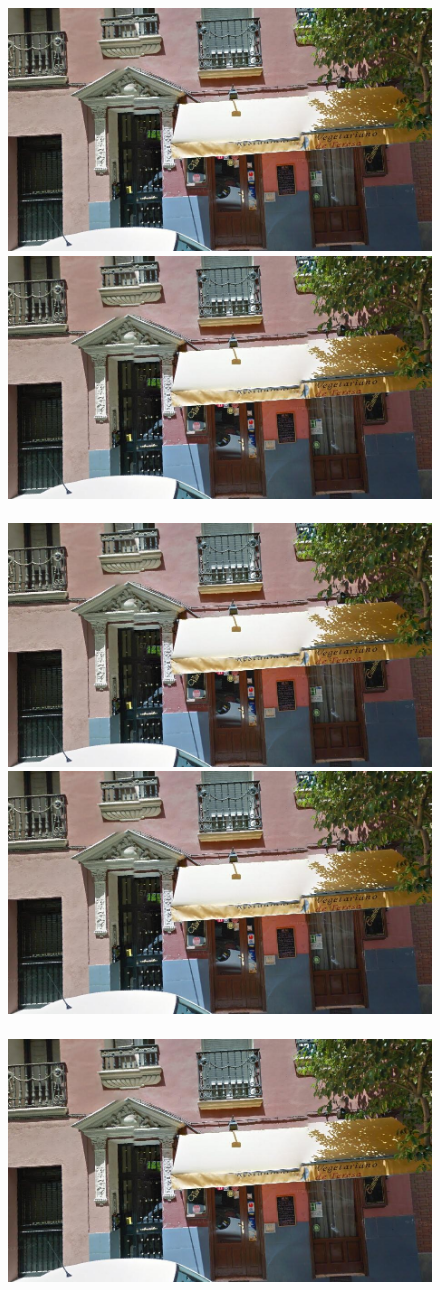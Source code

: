 \documentclass[runningheads, table]{llncs}
\begin{document}
\begin{figure}
  \begin{minipage}{\linewidth}
    \begin{minipage}{0.3\linewidth}
      \includegraphics[width=0.49\linewidth]{imgs/cutout_pitch04.jpg}
      \includegraphics[width=0.49\linewidth]{imgs/cutout_pitch04.jpg}
      \\ \vspace{-3mm} \\
      \includegraphics[width=0.49\linewidth]{imgs/cutout_pitch04.jpg}
      \includegraphics[width=0.49\linewidth]{imgs/cutout_pitch04.jpg}
      \\ \vspace{-3mm} \\
      \includegraphics[width=0.49\linewidth]{imgs/cutout_pitch04.jpg}

\end{minipage}
\end{minipage}
\end{figure}
\end{document}
